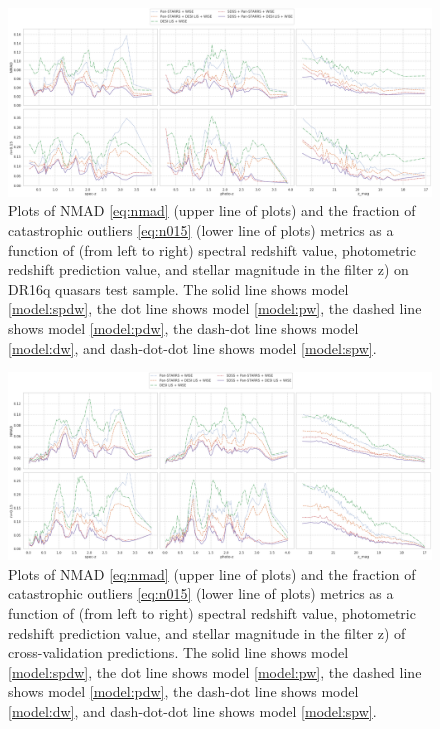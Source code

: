 \documentclass[fleqn,usenatbib]{mnras}
\begin{document}
\begin{figure}
    \centering
    \includegraphics[width=0.9\linewidth]{images/metrics-dr16q-ab-mini.png}
    \caption{Plots of NMAD \eqref{eq:nmad} (upper line of plots) and the fraction of catastrophic outliers \eqref{eq:n015} (lower line of plots) metrics as a function of (from left to right) spectral redshift value, photometric redshift prediction value, and stellar magnitude in the filter z) on DR16q quasars test sample. The solid line shows model \ref{model:spdw}, the dot line shows model \ref{model:pw}, the dashed line shows model \ref{model:pdw}, the dash-dot line shows model \ref{model:dw}, and dash-dot-dot line shows model \ref{model:spw}.}
    \label{fig:metrics-dr16q}
\end{figure}

\begin{figure}
    \centering
    \includegraphics[width=0.9\linewidth]{images/metrics-cv2-ab-mini.png}
    \caption{Plots of NMAD \eqref{eq:nmad} (upper line of plots) and the fraction of catastrophic outliers \eqref{eq:n015} (lower line of plots) metrics as a function of (from left to right) spectral redshift value, photometric redshift prediction value, and stellar magnitude in the filter z) of cross-validation predictions. The solid line shows model \ref{model:spdw}, the dot line shows model \ref{model:pw}, the dashed line shows model \ref{model:pdw}, the dash-dot line shows model \ref{model:dw}, and dash-dot-dot line shows model \ref{model:spw}.}
    \label{fig:metrics-cv2-total}
\end{figure}
\end{document}
